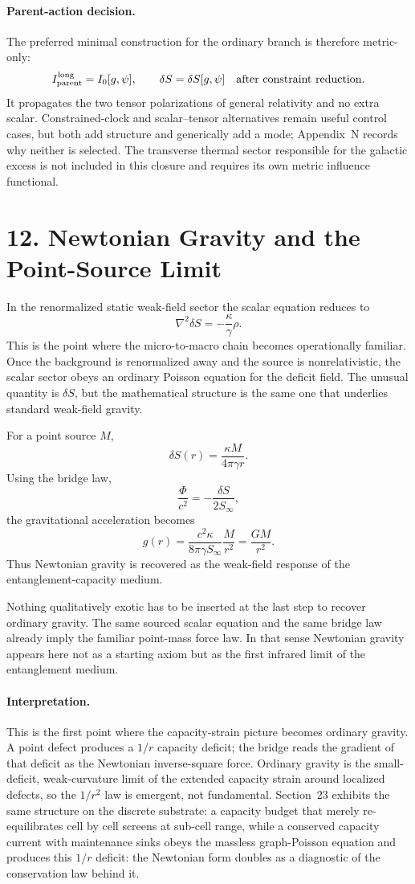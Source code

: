 \documentclass[11pt]{article}
\begin{document}
\paragraph{Parent-action decision.}
The preferred minimal construction for the ordinary branch is therefore metric-only:
\[
I_{\mathrm{parent}}^{\mathrm{long}}=I_0[g,\psi],
\qquad
\delta S=\delta S[g,\psi]\quad\hbox{after constraint reduction}.
\]
It propagates the two tensor polarizations of general relativity and no extra scalar. Constrained-clock and scalar--tensor alternatives remain useful control cases, but both add structure and generically add a mode; Appendix~N records why neither is selected. The transverse thermal sector responsible for the galactic excess is not included in this closure and requires its own metric influence functional.

\section{12. Newtonian Gravity and the Point-Source Limit}

In the renormalized static weak-field sector the scalar equation reduces to
\[
\nabla^2\delta S=-\frac{\kappa}{\gamma}\rho.
\]
This is the point where the micro-to-macro chain becomes operationally familiar. Once the background is renormalized away and the source is nonrelativistic, the scalar sector obeys an ordinary Poisson equation for the deficit field. The unusual quantity is $\delta S$, but the mathematical structure is the same one that underlies standard weak-field gravity.

For a point source $M$,
\[
\delta S(r)=\frac{\kappa M}{4\pi\gamma r}.
\]
Using the bridge law,
\[
\frac{\Phi}{c^2}=-\frac{\delta S}{2S_\infty},
\]
the gravitational acceleration becomes
\[
g(r)=\frac{c^2\kappa}{8\pi\gamma S_\infty}\frac{M}{r^2}
=
\frac{GM}{r^2}.
\]
Thus Newtonian gravity is recovered as the weak-field response of the entanglement-capacity medium.

Nothing qualitatively exotic has to be inserted at the last step to recover ordinary gravity. The same sourced scalar equation and the same bridge law already imply the familiar point-mass force law. In that sense Newtonian gravity appears here not as a starting axiom but as the first infrared limit of the entanglement medium.

\paragraph{Interpretation.}
This is the first point where the capacity-strain picture becomes ordinary gravity. A point defect produces a $1/r$ capacity deficit; the bridge reads the gradient of that deficit as the Newtonian inverse-square force. Ordinary gravity is the small-deficit, weak-curvature limit of the extended capacity strain around localized defects, so the $1/r^2$ law is emergent, not fundamental. Section~23 exhibits the same structure on the discrete substrate: a capacity budget that merely re-equilibrates cell by cell screens at sub-cell range, while a conserved capacity current with maintenance sinks obeys the massless graph-Poisson equation and produces this $1/r$ deficit: the Newtonian form doubles as a diagnostic of the conservation law behind it.
\end{document}
